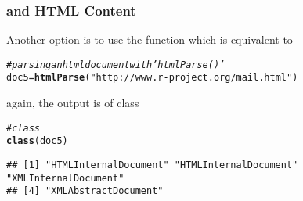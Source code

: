 \documentclass[12pt]{beamer}\usepackage[]{graphicx}\usepackage[]{color}
\makeatletter
\newcommand{\hlstr}[1]{\textcolor[rgb]{0.192,0.494,0.8}{#1}}%
\newcommand{\hlcom}[1]{\textcolor[rgb]{0.678,0.584,0.686}{\textit{#1}}}%
\newcommand{\hlstd}[1]{\textcolor[rgb]{0.345,0.345,0.345}{#1}}%
\newcommand{\hlkwb}[1]{\textcolor[rgb]{0.69,0.353,0.396}{#1}}%
\newcommand{\hlkwd}[1]{\textcolor[rgb]{0.737,0.353,0.396}{\textbf{#1}}}%
\newenvironment{kframe}{%
 \def\at@end@of@kframe{}%
 \ifinner\ifhmode%
  \def\at@end@of@kframe{\end{minipage}}%
  \begin{minipage}{\columnwidth}%
 \fi\fi%
 \def\FrameCommand##1{\hskip\@totalleftmargin \hskip-\fboxsep
 \colorbox{shadecolor}{##1}\hskip-\fboxsep
     \hskip-\linewidth \hskip-\@totalleftmargin \hskip\columnwidth}%
 \MakeFramed {\advance\hsize-\width
   \@totalleftmargin\z@ \linewidth\hsize
   \@setminipage}}%
 {\par\unskip\endMakeFramed%
 \at@end@of@kframe}
\newenvironment{knitrout}{}{} %
\makeatother
\begin{document}
\begin{frame}[fragile]
\frametitle{ and HTML Content}

Another option is to use the function {\hilit {}} which is equivalent to 

\begin{knitrout}\footnotesize
{}\color{fgcolor}\begin{kframe}
\begin{alltt}
\hlcom{# parsing an html document with 'htmlParse()'}
\hlstd{doc5} \hlkwb{=} \hlkwd{htmlParse}\hlstd{(}\hlstr{"http://www.r-project.org/mail.html"}\hlstd{)}
\end{alltt}
\end{kframe}
\end{knitrout}

again, the output is of class {\hilit {}}

\begin{knitrout}\footnotesize
{}\color{fgcolor}\begin{kframe}
\begin{alltt}
\hlcom{# class }
\hlkwd{class}\hlstd{(doc5)}
\end{alltt}
\begin{verbatim}
## [1] "HTMLInternalDocument" "HTMLInternalDocument" "XMLInternalDocument" 
## [4] "XMLAbstractDocument"
\end{verbatim}
\end{kframe}
\end{knitrout}
\eb

\end{frame}

\end{document}
